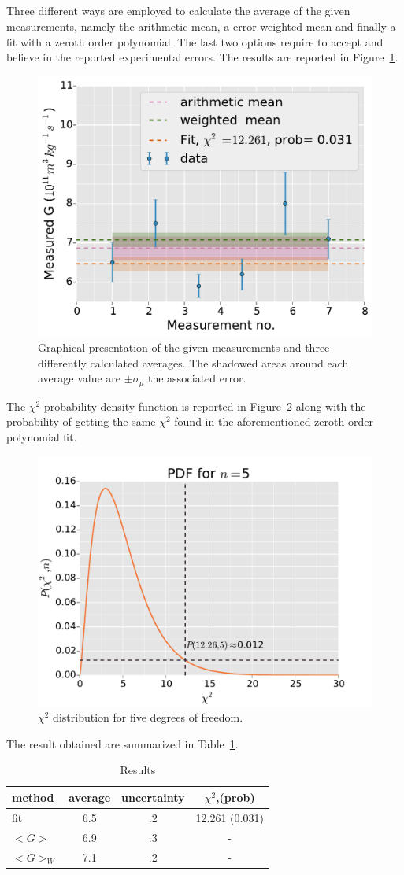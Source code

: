 \documentclass[twocolumn]{article}
\begin{document}
\subsection{} %
	Three different ways are employed to calculate the average of the given measurements, namely the arithmetic mean, a error weighted mean and finally a fit with a zeroth order polynomial.
	The last two options require to accept and believe in the reported experimental errors.
	The results are reported in Figure~\ref{fig:g}.
	\begin{figure}[h!]
		\begin{center}
			\includegraphics[width=.4\textwidth]{fig/g.pdf}
		\end{center}
		\caption{Graphical presentation of the given measurements and three differently calculated averages. The shadowed areas around each average value are $\pm \sigma_{\mu}$ the associated error.}
		\label{fig:g}
	\end{figure}
	The $\chi ^2 $ probability density function is reported in Figure~\ref{fig:xpdf} along with the probability of getting the same $\chi ^2 $ found in the aforementioned zeroth order polynomial fit.
	\begin{figure}[!]
		\begin{center}
			\includegraphics[width=.4 \textwidth]{fig/xpdf.pdf}
		\end{center}
		\caption{$\chi^2$ distribution for five degrees of freedom.}
		\label{fig:xpdf}
	\end{figure}
	The result obtained are summarized in Table~\ref{tab:res}.
	\begin{table}[h]
		\caption{Results}
		\label{tab:res}
		\begin{center}
			\begin{tabular}{l|ccc}
			\hline

			\hline
			\textbf{method} & \textbf{average} & \textbf{uncertainty} & \textbf{$\chi ^2 $,(prob)} \\
			\hline
			fit & 6.5 & .2 & 12.261 (0.031) \\
			$<G> $ & 6.9 & .3 & - \\
			$<G>_W$ &  7.1 & .2 & - \\
			\hline
			\hline
			\end{tabular}
		\end{center}
	\end{table}
\end{document}
